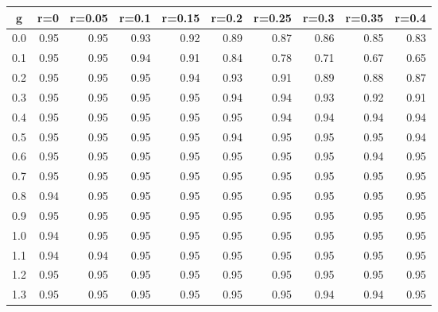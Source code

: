 %
\begin{table}[!tbp]
 \begin{center}
 \begin{tabular}{rrrrrrrrrr}\hline\hline
\multicolumn{1}{c}{g}&\multicolumn{1}{c}{r=0}&\multicolumn{1}{c}{r=0.05}&\multicolumn{1}{c}{r=0.1}&\multicolumn{1}{c}{r=0.15}&\multicolumn{1}{c}{r=0.2}&\multicolumn{1}{c}{r=0.25}&\multicolumn{1}{c}{r=0.3}&\multicolumn{1}{c}{r=0.35}&\multicolumn{1}{c}{r=0.4}\tabularnewline
\hline
0.0&0.95&0.95&0.93&0.92&0.89&0.87&0.86&0.85&0.83\tabularnewline
0.1&0.95&0.95&0.94&0.91&0.84&0.78&0.71&0.67&0.65\tabularnewline
0.2&0.95&0.95&0.95&0.94&0.93&0.91&0.89&0.88&0.87\tabularnewline
0.3&0.95&0.95&0.95&0.95&0.94&0.94&0.93&0.92&0.91\tabularnewline
0.4&0.95&0.95&0.95&0.95&0.95&0.94&0.94&0.94&0.94\tabularnewline
0.5&0.95&0.95&0.95&0.95&0.94&0.95&0.95&0.95&0.94\tabularnewline
0.6&0.95&0.95&0.95&0.95&0.95&0.95&0.95&0.94&0.95\tabularnewline
0.7&0.95&0.95&0.95&0.95&0.95&0.95&0.95&0.95&0.95\tabularnewline
0.8&0.94&0.95&0.95&0.95&0.95&0.95&0.95&0.95&0.95\tabularnewline
0.9&0.95&0.95&0.95&0.95&0.95&0.95&0.95&0.95&0.95\tabularnewline
1.0&0.94&0.95&0.95&0.95&0.95&0.95&0.95&0.95&0.95\tabularnewline
1.1&0.94&0.94&0.95&0.95&0.95&0.95&0.95&0.95&0.95\tabularnewline
1.2&0.95&0.95&0.95&0.95&0.95&0.95&0.95&0.95&0.95\tabularnewline
1.3&0.95&0.95&0.95&0.95&0.95&0.95&0.94&0.94&0.95\tabularnewline
\hline
\end{tabular}

\end{center}

\end{table}

